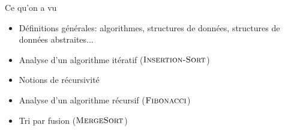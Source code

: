 \begin{frame}{Ce qu'on a vu}

\begin{itemize}
\item Définitions générales: algorithmes, structures de données, structures de données abstraites...
\item Analyse d'un algorithme itératif ($\textnormal{\scshape Insertion-Sort}$)
\item Notions de récursivité
\item Analyse d'un algorithme récursif ($\textnormal{\scshape Fibonacci}$)
\item Tri par fusion ($\textnormal{\scshape MergeSort}$)
\end{itemize}

\end{frame}
